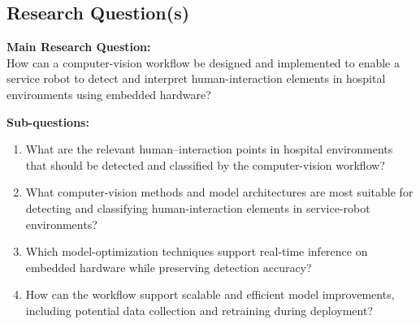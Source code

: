 \subsection{Research Question(s)}
\textbf{Main Research Question:} \\
How can a computer-vision workflow be designed and implemented to enable a service robot to detect and interpret human-interaction elements in hospital environments using embedded hardware?

\textbf{Sub-questions:}
\begin{enumerate}
    \item What are the relevant human–interaction points in hospital environments that should be detected and classified by the computer-vision workflow?
    \item What computer-vision methods and model architectures are most suitable for detecting and classifying human-interaction elements in service-robot environments?
    \item Which model-optimization techniques support real-time inference on embedded hardware while preserving detection accuracy?
    \item How can the workflow support scalable and efficient model improvements, including potential data collection and retraining during deployment?
\end{enumerate}
